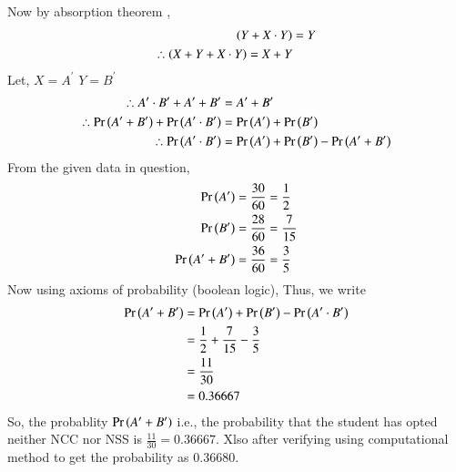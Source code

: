 \documentclass[journal]{IEEEtran}
\begin{document}
Now by absorption theorem , 
\begin{align}
\left(Y + X \cdot Y\right) &= Y \\
\therefore \left(X + Y+X \cdot Y\right) = X + Y  
\end{align}
Let, $X = A^\prime$ $Y = B^\prime $
\begin{align}
    \therefore  {A^\prime \cdot B^\prime} + {A^\prime + B^\prime}&= {A^\prime} + {B^\prime} \\
    \therefore  \Pr\left(A^\prime + B^\prime\right) + \Pr\left(A^\prime \cdot B^\prime\right)&= \Pr\left(A^\prime\right) + \Pr\left(B^\prime\right) \\
    \therefore  \Pr\left(A^\prime \cdot B^\prime\right) &= \Pr\left(A^\prime\right) + \Pr\left(B^\prime\right) - \Pr\left(A^\prime + B^\prime\right)
\end{align}
From the given data in question,
    \begin{align}
        \Pr\left(A^\prime\right) &= \frac{30}{60} = \frac{1}{2} \\
        \Pr\left(B^\prime\right) &= \frac{28}{60} = \frac{7}{15} \\
        \Pr\left(A^\prime + B^\prime\right) &= \frac{36}{60} = \frac{3}{5}    
    \end{align}
Now using axioms of probability (boolean logic),
Thus, we write
    \begin{align}
	    \Pr\left(A^\prime + B^\prime\right) &= \Pr\left(A^\prime\right) +  \Pr\left(B^\prime\right) - \Pr\left(A^\prime \cdot B^\prime\right) \\
	                                 &= \frac{1}{2} + \frac{7}{15} - \frac{3}{5} \\
	                                 &= \frac{11}{30} \\
	                                 &= 0.36667
    \end{align} 
So, the probablity $\Pr\left(A^\prime + B^\prime\right)$ i.e., the probability that the student has opted neither NCC nor NSS is $\frac{11}{30} = 0.36667$.
Xlso after verifying using computational method to get the probability as 0.36680.
\end{document}
